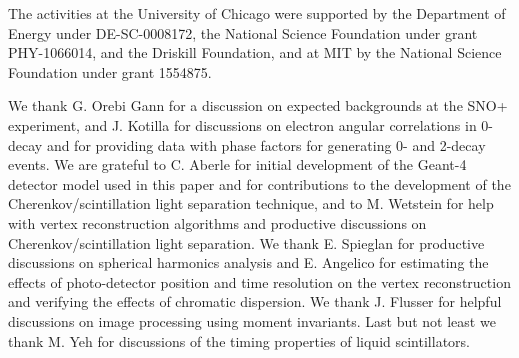 The activities at the University of Chicago  were supported by the
Department of Energy under DE-SC-0008172, the
National Science Foundation under grant PHY-1066014, and the Driskill
Foundation, and at MIT by  the
National Science Foundation under grant 1554875.

We thank G. Orebi Gann for a discussion on expected backgrounds
at the SNO+ experiment, and J.  Kotilla for discussions on electron
angular correlations in 0\nbb-decay and for providing data with phase
factors for generating 0\nbb- and 2\nbb-decay events.  We are grateful
to C. Aberle for initial development of the Geant-4
detector model used in this paper and for contributions to the
development of the Cherenkov/scintillation light separation technique, and
to M.  Wetstein for help with vertex reconstruction algorithms and
productive discussions on Cherenkov/scintillation light separation. We
thank E. Spieglan for productive discussions on spherical harmonics
analysis and E. Angelico for estimating the effects of photo-detector
position and time resolution on the vertex reconstruction and
verifying the effects of chromatic dispersion.  We thank J. Flusser
for helpful discussions on image processing using moment
invariants. Last but not least we thank M. Yeh for discussions of the
timing properties of liquid scintillators.
